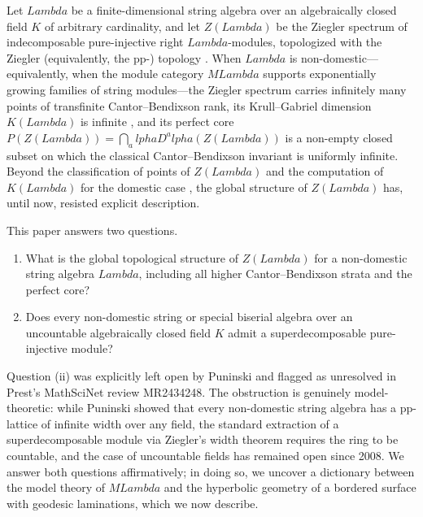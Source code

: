 \documentclass[11pt,a4paper,reqno]{amsart}
\def\mathcal#1{#1}%
\def\mathbb#1{#1}%
\def\operatorname#1{#1}%
\def\K{K}%
\def\Zg{Z}%
\def\Mod{M}%
\def\KG{K}%
\def\alpha{alpha}%
\def\Lambda{Lambda}%
\def\emph#1{#1}%
\theoremstyle{definition}
\theoremstyle{remark}
\newcommand{\K}{\mathbb{K}}
\newcommand{\Mod}[1]{\operatorname{Mod}(#1)}
\newcommand{\Zg}{\operatorname{Zg}}
\newcommand{\KG}{\operatorname{KG}}
\begin{document}
Let $\Lambda$ be a finite-dimensional string algebra over an algebraically closed field $\K$ of arbitrary cardinality, and let $\Zg(\Lambda)$ be the Ziegler spectrum of indecomposable pure-injective right $\Lambda$-modules, topologized with the Ziegler (equivalently, the pp-) topology \cite{Ziegler1984, Prest2009}. When $\Lambda$ is \emph{non-domestic}---equivalently, when the module category $\Mod{\Lambda}$ supports exponentially growing families of string modules---the Ziegler spectrum carries infinitely many points of transfinite Cantor--Bendixson rank, its Krull--Gabriel dimension $\KG(\Lambda)$ is infinite \cite{Schroer2000b, PrestPuninski2002}, and its perfect core $\mathcal{P}(\Zg(\Lambda)) = \bigcap_\alpha D^\alpha(\Zg(\Lambda))$ is a non-empty closed subset on which the classical Cantor--Bendixson invariant is uniformly infinite. Beyond the classification of \emph{points} of $\Zg(\Lambda)$ \cite{PrestPuninski2002} and the computation of $\KG(\Lambda)$ for the domestic case \cite{Schroer2000b, LPP2018}, the global structure of $\Zg(\Lambda)$ has, until now, resisted explicit description.

This paper answers two questions.

\begin{enumerate}[label=(\roman*), leftmargin=*]
\item \emph{What is the global topological structure of $\Zg(\Lambda)$ for a non-domestic string algebra $\Lambda$, including all higher Cantor--Bendixson strata and the perfect core?}
\item \emph{Does every non-domestic string or special biserial algebra over an \emph{uncountable} algebraically closed field $\K$ admit a superdecomposable pure-injective module?}
\end{enumerate}

Question (ii) was explicitly left open by Puninski \cite[Abstract and \S4]{Puninski2008} and flagged as unresolved in Prest's MathSciNet review MR2434248. The obstruction is genuinely model-theoretic: while Puninski showed that every non-domestic string algebra has a pp-lattice of infinite width over any field, the standard extraction of a superdecomposable module via Ziegler's width theorem requires the ring to be countable, and the case of uncountable fields has remained open since 2008. We answer both questions affirmatively; in doing so, we uncover a dictionary between the model theory of $\Mod{\Lambda}$ and the hyperbolic geometry of a bordered surface with geodesic laminations, which we now describe.
\end{document}
